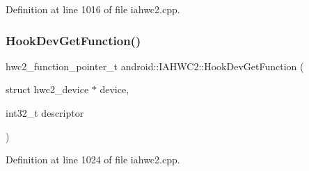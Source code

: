 Definition at line 1016 of file iahwc2.\+cpp.


\begin{DoxyCode}{0}
\end{DoxyCode}
\mbox{\label{classandroid_1_1IAHWC2_a71d1f51b751729750a04a18f11d5fd64}} 
\subsubsection{\texorpdfstring{Hook\+Dev\+Get\+Function()}{HookDevGetFunction()}}
{\footnotesize\ttfamily hwc2\+\_\+function\+\_\+pointer\+\_\+t android\+::\+I\+A\+H\+W\+C2\+::\+Hook\+Dev\+Get\+Function (\begin{DoxyParamCaption}\item[{struct hwc2\+\_\+device $\ast$}]{device,  }\item[{int32\+\_\+t}]{descriptor }\end{DoxyParamCaption})\hspace{0.3cm}{\ttfamily [static]}}



Definition at line 1024 of file iahwc2.\+cpp.


